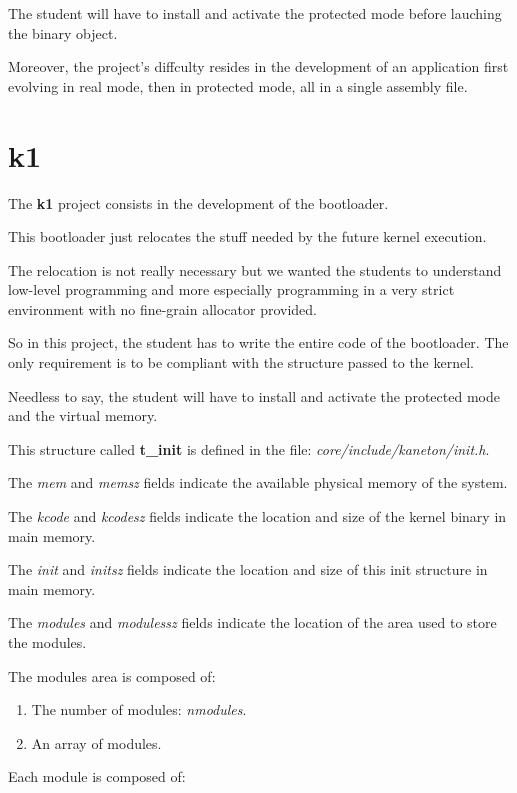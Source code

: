 The student will have to install and activate the protected mode before
lauching the binary object.

Moreover, the project's diffculty resides in the development of an
application first evolving in real mode, then in protected mode, all
in a single assembly file.

%
%

\section{k1}

The \textbf{k1} project consists in the development of the bootloader.

This bootloader just relocates the stuff needed by the future kernel
execution.

The relocation is not really necessary but we wanted the students
to understand low-level programming and more especially programming
in a very strict environment with no fine-grain allocator provided.

So in this project, the student has to write the entire code of the
bootloader. The only requirement is to be compliant with the structure
passed to the kernel.

Needless to say, the student will have to install and activate
the protected mode and the virtual memory.

This structure called \textbf{t\_init} is defined in the
file: \textit{core/include/kaneton/init.h}.

The \textit{mem} and \textit{memsz} fields indicate the available physical
memory of the system.

The \textit{kcode} and \textit{kcodesz} fields indicate the location and
size of the kernel binary in main memory.

The \textit{init} and \textit{initsz} fields indicate the location and
size of this init structure in main memory.

The \textit{modules} and \textit{modulessz} fields indicate the
location of the area used to store the modules.

The modules area is composed of:

\begin{enumerate}
  \item
    The number of modules: \textit{nmodules}.
  \item
    An array of modules.
\end{enumerate}

Each module is composed of:

